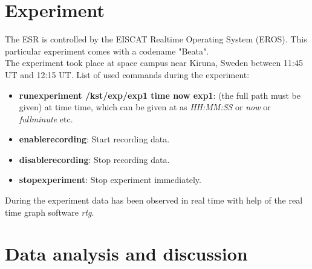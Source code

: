 \documentclass{article}
\begin{document}

\section{Experiment}

The ESR is controlled by the EISCAT Realtime Operating System (EROS). This particular experiment comes with a codename "Beata".\\
The experiment took place at space campus near Kiruna, Sweden between 11:45 UT and 12:15 UT.
List of used commands during the experiment:
\begin{itemize}
\item \textbf{runexperiment /kst/exp/exp1 time now exp1}: (the full path must be given) at time time, which can be given at as \emph{HH:MM:SS} or \emph{now} or \emph{fullminute} etc.
\item \textbf{enablerecording}: Start recording data.
\item \textbf{disablerecording}: Stop recording data.
\item \textbf{stopexperiment}: Stop experiment immediately.
\end{itemize}
During the experiment data has been observed in real time with help of the real time graph software \emph{rtg}.


\section{Data analysis and discussion}
\end{document}
